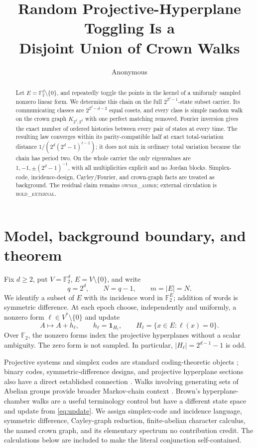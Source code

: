 \documentclass[a4paper,10pt]{amsart}
\title[Projective-hyperplane toggling]{Random Projective-Hyperplane Toggling Is a\\
Disjoint Union of Crown Walks}
\author{Anonymous}
\date{}
\theoremstyle{remark}
\newcommand{\F}{\mathbb F}
\begin{document}
\begin{abstract}
Let $E=\F_2^d\setminus\{0\}$, and repeatedly toggle the points in the
kernel of a uniformly sampled nonzero linear form.  We determine this chain
on the full $2^{2^d-1}$-state subset carrier.  Its communicating classes are
$2^{2^d-d-2}$ equal cosets, and every class is simple random walk on the
crown graph $K_{2^d,2^d}$ with one perfect matching removed.  Fourier
inversion gives the exact number of ordered histories between every pair of
states at every time.  The resulting law converges within its
parity-compatible half at exact total-variation distance
$1/(2^d(2^d-1)^{t-1})$; it does not mix in ordinary total variation because
the chain has period two.  On the whole carrier the only eigenvalues are
$1,-1,\pm(2^d-1)^{-1}$, with all multiplicities explicit and no Jordan
blocks.  Simplex-code, incidence-design, Cayley/Fourier, and crown-graph
facts are treated as background.  The residual claim remains
\textsc{owner\_amber}; external circulation is \textsc{hold\_external}.
\end{abstract}

\maketitle

\section{Model, background boundary, and theorem}

Fix $d\ge2$, put $V=\F_2^d$, $E=V\setminus\{0\}$, and write
\begin{equation}\label{eq:parameters}
             q=2^d,\qquad N=q-1,\qquad m=|E|=N.
\end{equation}
We identify a subset of $E$ with its incidence word in $\F_2^E$; addition
of words is symmetric difference.  At each epoch choose, independently and
uniformly, a nonzero form $\ell\in V^*\setminus\{0\}$ and update
\begin{equation}\label{eq:update}
 A\longmapsto A+ h_\ell,
 \qquad h_\ell=\mathbf 1_{H_\ell},\qquad
 H_\ell=\{x\in E:\ell(x)=0\}.
\end{equation}
Over $\F_2$, the nonzero forms index the projective hyperplanes without a
scalar ambiguity.  The zero form is not sampled.  In particular,
$|H_\ell|=2^{d-1}-1$ is odd.

Projective systems and simplex codes are standard coding-theoretic objects
\cite{KwiatkowskiPankovPasini2018}; binary codes, symmetric-difference
designs, and projective hyperplane sections also have a direct established
connection \cite{Tonchev1993}.  Walks involving generating sets of Abelian
groups provide broader Markov-chain context \cite{DiaconisSaloffCoste1996}.
Brown's hyperplane-chamber walks \cite{Brown2000} are a useful terminology
control but have a different state space and update from \eqref{eq:update}.
We assign simplex-code and incidence language, symmetric difference,
Cayley-graph reduction, finite-abelian character calculus, the named crown
graph, and its elementary spectrum no contribution credit.  The calculations
below are included to make the literal conjunction self-contained.
\end{document}
